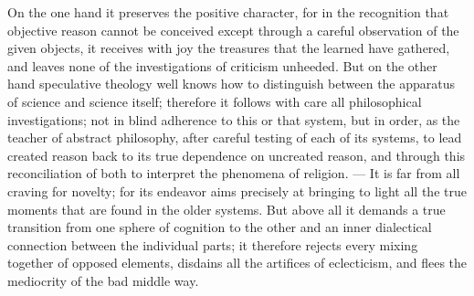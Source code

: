 \documentclass[12pt]{book}
\newcommand{\opage}[1]{\marginnote{\footnotesize\textit{[#1]}}}
\begin{document}
On the one hand it preserves the positive character, for in the recognition that
objective reason cannot be conceived except through a careful observation of the
given objects, it receives with joy the treasures that the learned have gathered,
and leaves none of the investigations of criticism unheeded. But on the other
hand speculative theology well knows how to distinguish between the apparatus of
science and science itself; therefore it follows with care
\opage{162}
all philosophical investigations; not in blind adherence to this or that system,
but in order, as the teacher of abstract philosophy, after careful testing of
each of its systems, to lead created reason back to its true dependence on
uncreated reason, and through this reconciliation of both to interpret the
phenomena of religion. --- It is far from all craving for novelty; for its
endeavor aims precisely at bringing to light all the true moments that are found
in the older systems. But above all it demands a true transition from one sphere
of cognition to the other and an inner dialectical connection between the
individual parts; it therefore rejects every mixing together of opposed elements,
disdains all the artifices of eclecticism, and flees the mediocrity of the bad
middle way.
\end{document}
